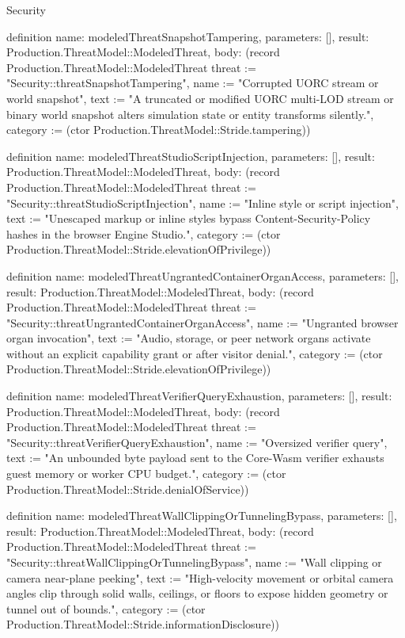 \begin{lexlean}{Security}
\begin{semanticmodule}
definition{
  name: modeledThreatSnapshotTampering,
  parameters: [],
  result: Production.ThreatModel::ModeledThreat,
  body: (record Production.ThreatModel::ModeledThreat {threat := "Security::threatSnapshotTampering", name := "Corrupted UORC stream or world snapshot", text := "A truncated or modified UORC multi-LOD stream or binary world snapshot alters simulation state or entity transforms silently.", category := (ctor Production.ThreatModel::Stride.tampering)})
}

definition{
  name: modeledThreatStudioScriptInjection,
  parameters: [],
  result: Production.ThreatModel::ModeledThreat,
  body: (record Production.ThreatModel::ModeledThreat {threat := "Security::threatStudioScriptInjection", name := "Inline style or script injection", text := "Unescaped markup or inline styles bypass Content-Security-Policy hashes in the browser Engine Studio.", category := (ctor Production.ThreatModel::Stride.elevationOfPrivilege)})
}

definition{
  name: modeledThreatUngrantedContainerOrganAccess,
  parameters: [],
  result: Production.ThreatModel::ModeledThreat,
  body: (record Production.ThreatModel::ModeledThreat {threat := "Security::threatUngrantedContainerOrganAccess", name := "Ungranted browser organ invocation", text := "Audio, storage, or peer network organs activate without an explicit capability grant or after visitor denial.", category := (ctor Production.ThreatModel::Stride.elevationOfPrivilege)})
}

definition{
  name: modeledThreatVerifierQueryExhaustion,
  parameters: [],
  result: Production.ThreatModel::ModeledThreat,
  body: (record Production.ThreatModel::ModeledThreat {threat := "Security::threatVerifierQueryExhaustion", name := "Oversized verifier query", text := "An unbounded byte payload sent to the Core-Wasm verifier exhausts guest memory or worker CPU budget.", category := (ctor Production.ThreatModel::Stride.denialOfService)})
}

definition{
  name: modeledThreatWallClippingOrTunnelingBypass,
  parameters: [],
  result: Production.ThreatModel::ModeledThreat,
  body: (record Production.ThreatModel::ModeledThreat {threat := "Security::threatWallClippingOrTunnelingBypass", name := "Wall clipping or camera near-plane peeking", text := "High-velocity movement or orbital camera angles clip through solid walls, ceilings, or floors to expose hidden geometry or tunnel out of bounds.", category := (ctor Production.ThreatModel::Stride.informationDisclosure)})
}


\end{semanticmodule}
\end{lexlean}
